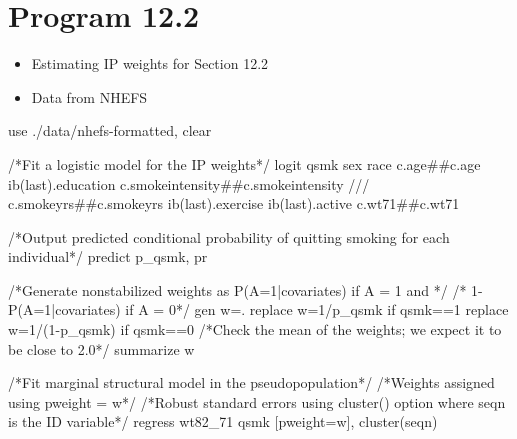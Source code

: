 \documentclass[
  10pt,
  a4paper,
]{book}
\newenvironment{Shaded}{\begin{snugshade}}{\end{snugshade}}
\newcommand{\CommentTok}[1]{\textcolor[rgb]{0.37,0.37,0.37}{#1}}
\newcommand{\FunctionTok}[1]{\textcolor[rgb]{0.28,0.35,0.67}{#1}}
\newcommand{\KeywordTok}[1]{\textcolor[rgb]{0.00,0.46,0.62}{#1}}
\newcommand{\NormalTok}[1]{\textcolor[rgb]{0.00,0.46,0.62}{#1}}
\providecommand{\tightlist}{%
  \setlength{\itemsep}{0pt}\setlength{\parskip}{0pt}}
\begin{document}
\section{Program 12.2}\label{program-12.2-1}

\begin{itemize}
\tightlist
\item
  Estimating IP weights for Section 12.2
\item
  Data from NHEFS
\end{itemize}

\begin{Shaded}
\begin{Highlighting}[]
\KeywordTok{use}\NormalTok{ ./}\KeywordTok{data}\NormalTok{/nhefs{-}formatted, }\KeywordTok{clear}

\CommentTok{/*Fit a logistic model for the IP weights*/} 
\KeywordTok{logit}\NormalTok{ qsmk sex race c.age\#\#c.age ib(}\FunctionTok{last}\NormalTok{).education c.smokeintensity\#\#c.smokeintensity }\CommentTok{///}
\NormalTok{c.smokeyrs\#\#c.smokeyrs ib(}\FunctionTok{last}\NormalTok{).exercise ib(}\FunctionTok{last}\NormalTok{).active c.wt71\#\#c.wt71 }

\CommentTok{/*Output predicted conditional probability of quitting smoking for each individual*/}
\KeywordTok{predict}\NormalTok{ p\_qsmk, pr}

\CommentTok{/*Generate nonstabilized weights as P(A=1|covariates) if A = 1 and */}
\CommentTok{/* 1{-}P(A=1|covariates) if A = 0*/}
\KeywordTok{gen} \FunctionTok{w}\NormalTok{=.}
\KeywordTok{replace} \FunctionTok{w}\NormalTok{=1/p\_qsmk }\KeywordTok{if}\NormalTok{ qsmk==1}
\KeywordTok{replace} \FunctionTok{w}\NormalTok{=1/(1{-}p\_qsmk) }\KeywordTok{if}\NormalTok{ qsmk==0}
\CommentTok{/*Check the mean of the weights; we expect it to be close to 2.0*/}
\KeywordTok{summarize} \FunctionTok{w}

\CommentTok{/*Fit marginal structural model in the pseudopopulation*/}
\CommentTok{/*Weights assigned using pweight = w*/}
\CommentTok{/*Robust standard errors using cluster() option where \textquotesingle{}seqn\textquotesingle{} is the ID variable*/}
\KeywordTok{regress}\NormalTok{ wt82\_71 qsmk [}\KeywordTok{pweight}\NormalTok{=}\FunctionTok{w}\NormalTok{], }\KeywordTok{cluster}\NormalTok{(seqn) }
\end{Highlighting}
\end{Shaded}
\end{document}
